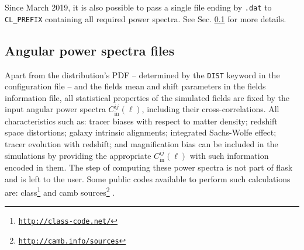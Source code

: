 \documentclass[12pt]{book} %
\newcommand{\nv}[1]{\mathrm{#1}}                 %
\begin{document}
Since March 2019, it is also possible to pass a single file ending by {\tt .dat} to 
{\tt CL\_PREFIX} containing all required power spectra. See Sec. \ref{sec:cls} for 
more details. 


\subsection{Angular power spectra files}
\label{sec:cls}

Apart from the distribution's PDF -- determined by the {\tt DIST} keyword in 
the configuration file -- and the fields mean and shift parameters in the fields 
information file, all statistical properties of the simulated fields are fixed 
by the input angular power spectra $C_{\nv{in}}^{ij}(\ell)$, including their 
cross-correlations. All characteristics 
such as: tracer biases with respect to matter density; redshift space distortions; 
galaxy intrinsic alignments; integrated Sachs-Wolfe effect; tracer evolution with 
redshift; and magnification bias can be included in the simulations by providing the 
appropriate $C_{\nv{in}}^{ij}(\ell)$ with such information encoded in them. The 
step of computing these power spectra is not part of {\sc flask} and is left to the user. 
Some public codes available to perform such calculations are: 
{\sc class}\footnote{\tt{\href{http://class-code.net/}{http://class-code.net/}}} 
\citep{Blas11x, Dio13x} and 
{\sc camb sources}\footnote{\tt{\href{http://camb.info/sources}{http://camb.info/sources}}}
\citep{Challinor11x}.
\end{document}
